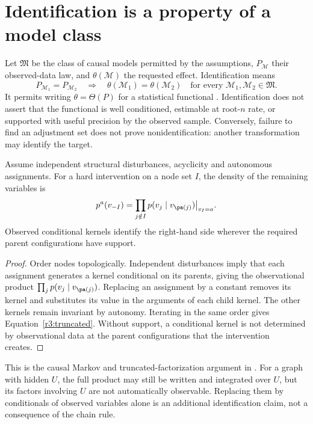 \section{Identification is a property of a model class}
\label{r3:identification}
Let $\mathfrak M$ be the class of causal models permitted by the assumptions,
$P_{\mathcal M}$ their observed-data law, and $\theta(\mathcal M)$ the
requested effect. Identification means
\begin{equation}
 P_{\mathcal M_1}=P_{\mathcal M_2}
 \quad\Longrightarrow\quad
 \theta(\mathcal M_1)=\theta(\mathcal M_2)
 \quad\text{for every }\mathcal M_1,\mathcal M_2\in\mathfrak M.
 \label{r3:id-definition}
\end{equation}
It permits writing $\theta=\Theta(P)$ for a statistical functional
\citep[Definition 2]{pearl2009}. Identification does not assert that the
functional is well conditioned, estimable at root-$n$ rate, or supported
with useful precision by the observed sample. Conversely, failure to find
an adjustment set does not prove nonidentification: another transformation
may identify the target.

\begin{proposition}
Assume independent structural disturbances, acyclicity and autonomous
assignments. For a hard intervention on a node set $I$, the density of the
remaining variables is
\begin{equation}
 p^a(v_{-I})=\prod_{j\notin I}p(v_j\mid v_{\pa(j)})\big|_{v_I=a}.
 \label{r3:truncated}
\end{equation}
Observed conditional kernels identify the right-hand side wherever the
required parent configurations have support.
\end{proposition}
\begin{proof}
Order nodes topologically. Independent disturbances imply that each
assignment generates a kernel conditional on its parents, giving the
observational product $\prod_j p(v_j\mid v_{\pa(j)})$. Replacing an
assignment by a constant removes its kernel and substitutes its value in
the arguments of each child kernel. The other kernels remain invariant
by autonomy. Iterating in the same order gives Equation~\eqref{r3:truncated}.
Without support, a conditional kernel is not determined by observational
data at the parent configurations that the intervention creates.
\end{proof}
This is the causal Markov and truncated-factorization argument in
\citet[Theorem 1 and Corollary 1]{pearl2009}. For a graph with hidden $U$,
the full product may still be written and integrated over $U$, but its
factors involving $U$ are not automatically observable. Replacing them by
conditionals of observed variables alone is an additional identification
claim, not a consequence of the chain rule.

